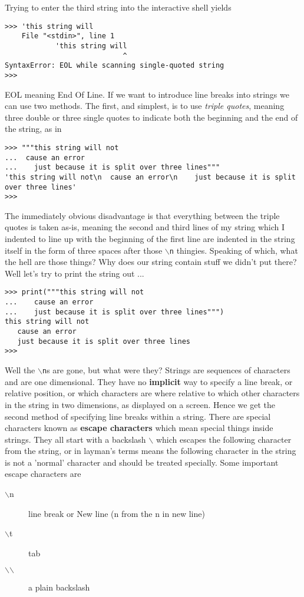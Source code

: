 Trying to enter the third string into the interactive shell yields
\begin{lstlisting}
>>> 'this string will
    File "<stdin>", line 1
            'this string will
                            ^
SyntaxError: EOL while scanning single-quoted string
>>>
\end{lstlisting}

EOL meaning End Of Line. If we want to introduce line breaks into   strings we can use two methods. The first, and simplest, is to use   \textit{triple quotes}, meaning three double or three single quotes to indicate   both the beginning and the end of the string, as in
\begin{lstlisting}
>>> """this string will not
...  cause an error
...    just because it is split over three lines"""
'this string will not\n  cause an error\n    just because it is split over three lines'
>>>
\end{lstlisting}

The immediately obvious disadvantage is that everything between the   triple quotes is taken as-is, meaning the second and third lines of my   string which I indented to line up with the beginning of the first line   are indented in the string itself in the form of three spaces after   those \texttt{$\backslash$n} thingies. Speaking of which, what the hell are those things?   Why does our string contain stuff we didn't put there? Well let's try   to print the string out ...
\begin{lstlisting}
>>> print("""this string will not
...    cause an error
...    just because it is split over three lines""")
this string will not
   cause an error
   just because it is split over three lines
>>>
\end{lstlisting}

Well the \texttt{$\backslash$n}s are gone, but what were they? Strings are sequences   of characters and are one dimensional. They have no   \textbf{implicit} way to specify a line break, or relative   position, or which characters are where relative to which other   characters in the string in two dimensions, as displayed on a screen.   Hence we get the second method of specifying line breaks within a   string. There are special characters known as \textbf{escape     characters} which mean special things inside strings. They all   start with a backslash \texttt{$\backslash$} which escapes the following character from   the string, or in layman's terms means the following character in the   string is not a 'normal' character and should be treated specially.   Some important escape characters are
\begin{description}
	\item[$\backslash$n] line break or New line (n from the n in new line)
	\item[$\backslash$t] tab
	\item[$\backslash$$\backslash$] a plain backslash
\end{description}

